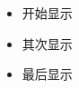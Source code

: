 \begin{frame}
\begin{itemize}[<+->]
  \item 开始显示
  \item 其次显示
  \item 最后显示
\end{itemize}
\end{frame}
